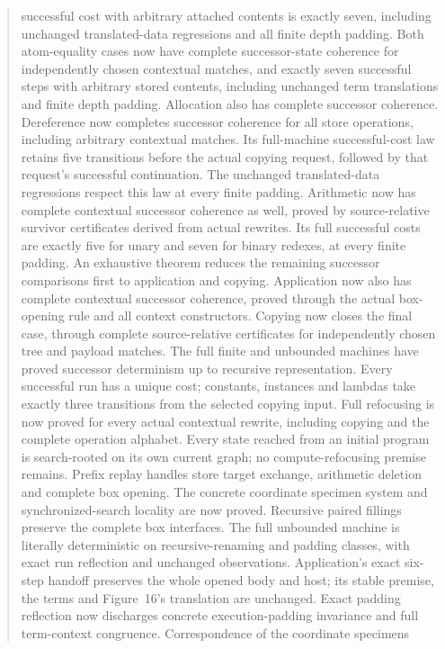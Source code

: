 \documentclass[11pt,a4paper]{article}
\theoremstyle{definition}
\theoremstyle{plain}
\theoremstyle{remark}
\begin{document}
\begin{abstract}
successful cost with arbitrary attached contents is exactly seven, including
unchanged translated-data regressions and all finite depth padding. Both atom-equality cases now
have complete successor-state coherence for independently chosen contextual
matches, and exactly seven successful steps with arbitrary stored contents,
including unchanged term translations and finite depth padding. Allocation
also has complete successor coherence. Dereference now completes successor
coherence for all store operations, including arbitrary contextual matches.
Its full-machine successful-cost law retains five transitions before the
actual copying request, followed by that request's successful continuation.
The unchanged translated-data regressions respect this law at every finite
padding. Arithmetic now has complete contextual successor coherence as well,
proved by source-relative survivor certificates derived from actual rewrites.
Its full successful costs are exactly five for unary and seven for binary
redexes, at every finite padding. An exhaustive theorem reduces the remaining
successor comparisons first to application and copying. Application now also has
complete contextual successor coherence, proved through the actual box-opening
rule and all context constructors. Copying now closes the final case, through
complete source-relative certificates for independently chosen tree and payload
matches. The full finite and unbounded machines have proved successor
determinism up to recursive representation. Every successful run has a unique
cost; constants, instances and lambdas take exactly three transitions from the
selected copying input. Full refocusing is now proved for every actual
contextual rewrite, including copying and the complete operation alphabet.
Every state reached from an initial program is search-rooted on its own
current graph; no compute-refocusing premise remains. Prefix replay handles
store target exchange, arithmetic deletion and complete box opening.
The concrete coordinate specimen system and synchronized-search locality are
now proved. Recursive paired fillings preserve the complete box interfaces.
The full unbounded machine is literally deterministic on recursive-renaming
and padding classes, with exact run reflection and unchanged observations.
Application's exact six-step handoff preserves the whole opened body and host;
its stable premise, the terms and Figure~16's translation are unchanged.
Exact padding reflection now discharges concrete execution-padding invariance
and full term-context congruence. Correspondence of the coordinate specimens

\end{abstract}
\end{document}
